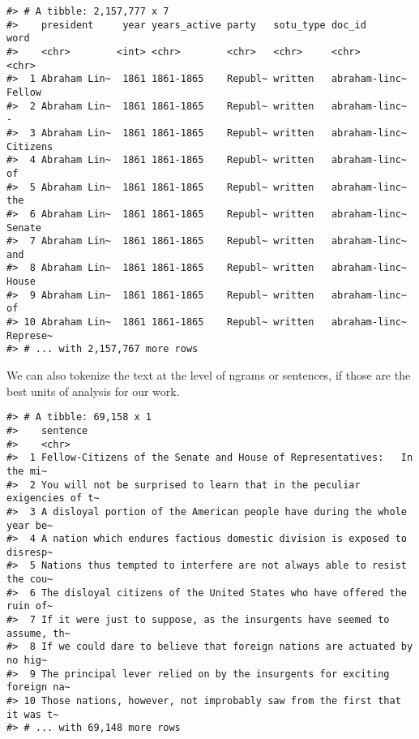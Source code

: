 \documentclass[]{book}
\newenvironment{Shaded}{\begin{snugshade}}{\end{snugshade}}
\newcommand{\CommentTok}[1]{\textcolor[rgb]{0.56,0.35,0.01}{\textit{#1}}}
\newcommand{\DataTypeTok}[1]{\textcolor[rgb]{0.13,0.29,0.53}{#1}}
\newcommand{\KeywordTok}[1]{\textcolor[rgb]{0.13,0.29,0.53}{\textbf{#1}}}
\newcommand{\NormalTok}[1]{#1}
\newcommand{\OperatorTok}[1]{\textcolor[rgb]{0.81,0.36,0.00}{\textbf{#1}}}
\newcommand{\OtherTok}[1]{\textcolor[rgb]{0.56,0.35,0.01}{#1}}
\newcommand{\StringTok}[1]{\textcolor[rgb]{0.31,0.60,0.02}{#1}}
\begin{document}
\begin{verbatim}
#> # A tibble: 2,157,777 x 7
#>    president     year years_active party   sotu_type doc_id        word    
#>    <chr>        <int> <chr>        <chr>   <chr>     <chr>         <chr>   
#>  1 Abraham Lin~  1861 1861-1865    Republ~ written   abraham-linc~ Fellow  
#>  2 Abraham Lin~  1861 1861-1865    Republ~ written   abraham-linc~ -       
#>  3 Abraham Lin~  1861 1861-1865    Republ~ written   abraham-linc~ Citizens
#>  4 Abraham Lin~  1861 1861-1865    Republ~ written   abraham-linc~ of      
#>  5 Abraham Lin~  1861 1861-1865    Republ~ written   abraham-linc~ the     
#>  6 Abraham Lin~  1861 1861-1865    Republ~ written   abraham-linc~ Senate  
#>  7 Abraham Lin~  1861 1861-1865    Republ~ written   abraham-linc~ and     
#>  8 Abraham Lin~  1861 1861-1865    Republ~ written   abraham-linc~ House   
#>  9 Abraham Lin~  1861 1861-1865    Republ~ written   abraham-linc~ of      
#> 10 Abraham Lin~  1861 1861-1865    Republ~ written   abraham-linc~ Represe~
#> # ... with 2,157,767 more rows
\end{verbatim}

We can also tokenize the text at the level of ngrams or sentences, if those are the best units of analysis for our work.

\begin{Shaded}
\end{Shaded}

\begin{verbatim}
#> # A tibble: 69,158 x 1
#>    sentence                                                                
#>    <chr>                                                                   
#>  1 Fellow-Citizens of the Senate and House of Representatives:   In the mi~
#>  2 You will not be surprised to learn that in the peculiar exigencies of t~
#>  3 A disloyal portion of the American people have during the whole year be~
#>  4 A nation which endures factious domestic division is exposed to disresp~
#>  5 Nations thus tempted to interfere are not always able to resist the cou~
#>  6 The disloyal citizens of the United States who have offered the ruin of~
#>  7 If it were just to suppose, as the insurgents have seemed to assume, th~
#>  8 If we could dare to believe that foreign nations are actuated by no hig~
#>  9 The principal lever relied on by the insurgents for exciting foreign na~
#> 10 Those nations, however, not improbably saw from the first that it was t~
#> # ... with 69,148 more rows
\end{verbatim}
\end{document}
